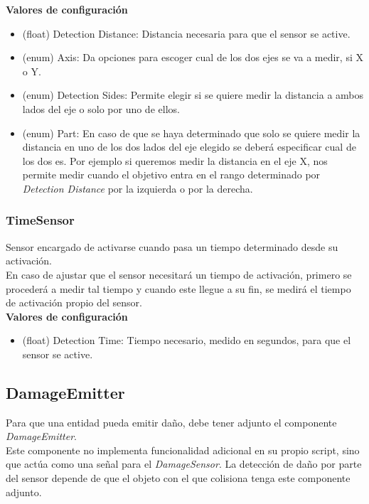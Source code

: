 \begin{itemize}
	\textbf{Valores de configuración}
	\begin{itemize}
	        \item (float) Detection Distance: Distancia necesaria para que el sensor se active.
	        \item (enum) Axis: Da opciones para escoger cual de los dos ejes se va a medir, si X o Y.
	        \item (enum) Detection Sides: Permite elegir si se quiere medir la distancia a ambos lados del eje o solo por uno de ellos. 
	        \item (enum) Part: En caso de que se haya determinado que solo se quiere medir la distancia en uno de los dos lados del eje elegido se deberá especificar cual de los dos es. Por ejemplo si queremos medir la distancia en el eje X, nos permite medir cuando el objetivo entra en el rango determinado por \textit{Detection Distance} por la izquierda o por la derecha.
	 \end{itemize}
\end{itemize}


\subsubsection{TimeSensor}

Sensor encargado de activarse cuando pasa un tiempo determinado desde su activación.\\
En caso de ajustar que el sensor necesitará un tiempo de activación, primero se procederá a medir tal tiempo y cuando este llegue a su fin, se medirá el tiempo de activación propio del sensor.\\

\textbf{Valores de configuración}
	\begin{itemize}
	        \item (float) Detection Time: Tiempo necesario, medido en segundos, para que el sensor se active.
	 \end{itemize}

\subsection{DamageEmitter}

Para que una entidad pueda emitir daño, debe tener adjunto el componente \textit{DamageEmitter}.\\
Este componente no implementa funcionalidad adicional en su propio script, sino que actúa como una señal para el \textit{DamageSensor}. La detección de daño por parte del sensor depende de que el objeto con el que colisiona tenga este componente adjunto.\\

